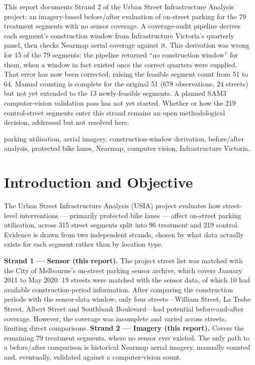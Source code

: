 \documentclass[10pt,conference]{IEEEtran}
\begin{document}
This report documents Strand 2 of the Urban Street Infrastructure Analysis project: an imagery-based before/after evaluation of on-street parking for the 79 treatment segments with no sensor coverage. A coverage-audit pipeline derives each segment's construction window from Infrastructure Victoria's quarterly panel, then checks Nearmap aerial coverage against it. This derivation was wrong for 15 of the 79 segments: the pipeline returned ``no construction window'' for them, when a window in fact existed once the correct quarters were supplied. That error has now been corrected, raising the feasible segment count from 51 to 64. Manual counting is complete for the original 51 (678 observations, 24 streets) but not yet extended to the 13 newly-feasible segments. A planned SAM3 computer-vision validation pass has not yet started. Whether or how the 219 control-street segments enter this strand remains an open methodological decision, addressed but not resolved here.

\vspace{0.2cm}
parking utilisation, aerial imagery, construction-window derivation, before/after analysis, protected bike lanes, Nearmap, computer vision, Infrastructure Victoria.

\section{Introduction and Objective}
The Urban Street Infrastructure Analysis (USIA) project evaluates how street-level interventions --- primarily protected bike lanes --- affect on-street parking utilisation, across 315 street segments split into 96 treatment and 219 control. Evidence is drawn from two independent strands, chosen by what data actually exists for each segment rather than by location type.

\textbf{Strand 1 — Sensor (this report).} The project street list was matched with the City of Melbourne’s on-street parking sensor archive, which covers January 2011 to May 2020. 19 streets were matched with the sensor data, of which  10 had available construction-period information. After comparing the construction periods with the sensor-data window, only four streets—William Street, La Trobe Street, Albert Street and Southbank Boulevard—had potential before-and-after coverage. However, the coverage was incomplete and varied across streets, limiting direct comparisons.
\textbf{Strand 2 --- Imagery (this report).} Covers the remaining 79 treatment segments, where no sensor ever existed. The only path to a before/after comparison is historical Nearmap aerial imagery, manually counted and, eventually, validated against a computer-vision count.
\end{document}
